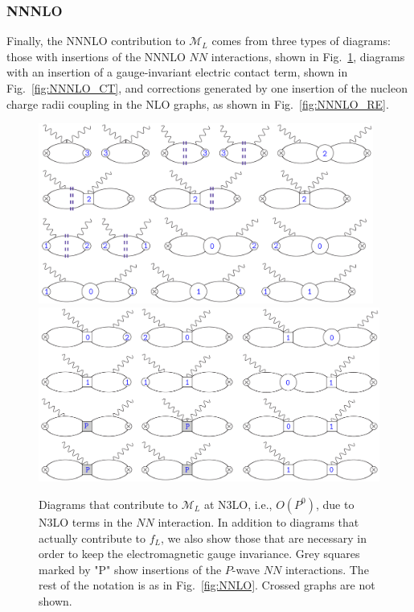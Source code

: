 \documentclass[prl,
twocolumn,
showpacs,preprintnumbers,amsmath,amssymb,
superscriptaddress,
a4paper,nofootinbib,longbibliography]{revtex4-2}
\begin{document}
\subsubsection{NNNLO}
Finally, the NNNLO contribution to $\mathcal{M}_L$ comes from three types of diagrams: those with insertions of the NNNLO $NN$ interactions, shown in Fig.~\ref{fig:NNNLO}, diagrams with an insertion of a gauge-invariant electric contact term, shown in Fig.~\ref{fig:NNNLO_CT}, and corrections generated by one insertion of the nucleon charge radii coupling in the NLO graphs, as shown in Fig.~\ref{fig:NNNLO_RE}.
\begin{figure}[!htbp]
    \centering
    \includegraphics[width=0.98\textwidth]{figs/VVCS_NNNLO_v1.pdf}\\
     \includegraphics[width=\textwidth]{figs/VVCS_NNNLO_Pt2_v1.pdf}
    \caption{Diagrams that contribute to $\mathcal{M}_L$ at N3LO, i.e., $O(P^0)$, due to N3LO terms in the $NN$ interaction. In addition to diagrams that actually contribute to $f_L$, we also show those that are necessary in order to keep the electromagnetic gauge invariance. Grey squares marked by "P" show insertions of the $P$-wave $NN$ interactions. The rest of the notation is as in Fig.~\ref{fig:NNLO}. Crossed graphs are not shown.}
    \label{fig:NNNLO}
\end{figure}
\end{document}
